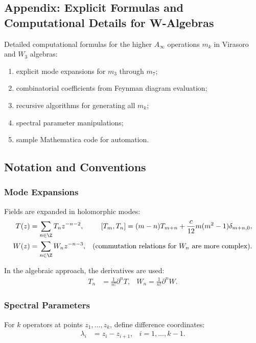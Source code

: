 

\subsection*{Appendix: Explicit Formulas and Computational Details for W-Algebras}
\label{app:W-algebras-explicit}

Detailed computational formulas for the higher $A_\infty$ operations $m_k$ in Virasoro and $W_3$ algebras:
\begin{enumerate}
\item explicit mode expansions for $m_3$ through $m_7$;
\item combinatorial coefficients from Feynman diagram evaluation;
\item recursive algorithms for generating all $m_k$;
\item spectral parameter manipulations;
\item sample Mathematica code for automation.
\end{enumerate}

\subsection{Notation and Conventions}

\subsubsection{Mode Expansions}

Fields are expanded in holomorphic modes:
\begin{align}
T(z) &= \sum_{n \in \Z} T_n z^{-n-2}, & [T_m, T_n] = (m-n)T_{m+n} + \frac{c}{12}m(m^2-1)\delta_{m+n,0},\\
W(z) &= \sum_{n \in \Z} W_n z^{-n-3}, & (\text{commutation relations for } W_n \text{ are more complex}).
\end{align}

In the algebraic approach, the derivatives are used:
\begin{align}
T_n &= \frac{1}{n!} \partial^n T, & W_n = \frac{1}{n!} \partial^n W.
\end{align}

\subsubsection{Spectral Parameters}

For $k$ operators at points $z_1, \ldots, z_k$, define difference coordinates:
\begin{align}
\lambda_i &= z_i - z_{i+1}, & i = 1, \ldots, k-1.
\end{align}

